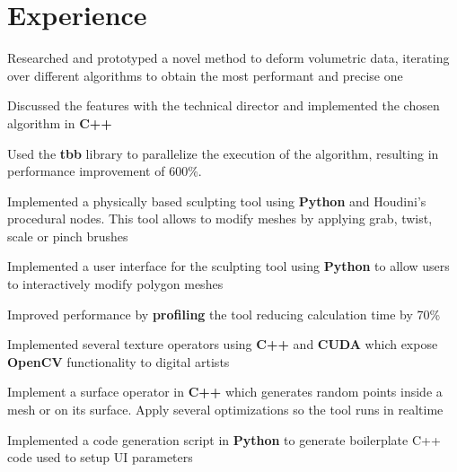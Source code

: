 \documentclass[]{deedy-resume-openfont}
\begin{document}
\begin{minipage}[t]{0.66\textwidth} 


\section{Experience}
\vspace{\topsep} %
\begin{tightemize}
    \item Researched and prototyped a novel method to deform volumetric data, iterating over different algorithms to obtain the most performant and precise one
    \item Discussed the features with the technical director and implemented the chosen algorithm in \textbf{C++}
    \item Used  the \textbf{tbb} library to parallelize the execution of the algorithm, resulting in performance improvement of 600\%.
\end{tightemize}
\begin{tightemize}
    \item Implemented a physically based sculpting tool using \textbf{Python} and Houdini's procedural nodes. This tool allows to modify meshes by applying grab, twist, scale or pinch brushes
    \item Implemented a user interface for the sculpting tool using \textbf{Python} to allow users to interactively modify polygon meshes
    \item Improved performance by \textbf{profiling} the tool reducing calculation time by 70\%
\end{tightemize}
\sectionsep

\begin{tightemize}
    \item Implemented several texture operators using \textbf{C++} and \textbf{CUDA} which expose \textbf{OpenCV} functionality to digital artists
    \item Implement a surface operator in \textbf{C++} which generates random points inside a mesh or on its surface. Apply several optimizations so the tool runs in realtime
    \item Implemented a code generation script in \textbf{Python} to generate boilerplate C++ code used to setup UI parameters
\end{tightemize}
\sectionsep


\end{minipage}
\end{document}
